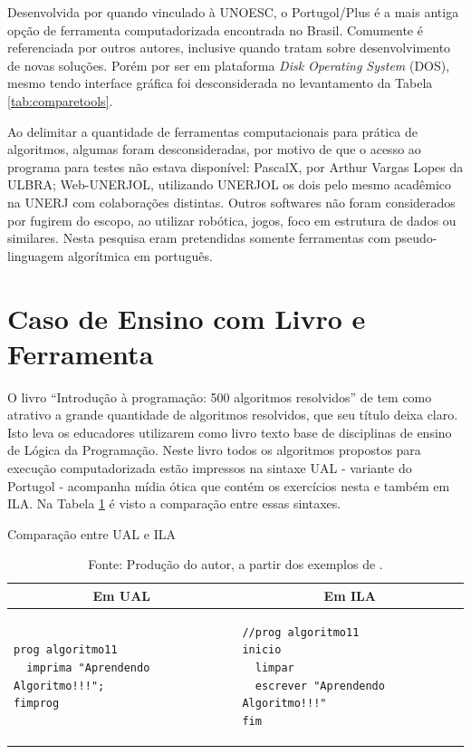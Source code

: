Desenvolvida por  quando vinculado à UNOESC, o Portugol/Plus é a mais antiga opção de ferramenta computadorizada encontrada no Brasil. Comumente é referenciada por outros autores, inclusive quando tratam sobre desenvolvimento de novas soluções. Porém por ser em plataforma \textit{Disk Operating System} (DOS), mesmo tendo interface gráfica foi desconsiderada no levantamento da Tabela \ref{tab:comparetools}.

Ao delimitar a quantidade de ferramentas computacionais para prática de algoritmos, algumas foram desconsideradas, por motivo de que o acesso ao programa para testes não estava disponível: PascalX, por Arthur Vargas Lopes da ULBRA; Web-UNERJOL\nocite{ferrandin2005etal}, utilizando UNERJOL os dois pelo mesmo acadêmico na UNERJ com colaborações distintas.
Outros softwares não foram considerados por fugirem do escopo, ao utilizar robótica, jogos, foco em estrutura de dados ou similares. Nesta pesquisa eram pretendidas somente ferramentas com pseudo-linguagem algorítmica em português.

\section{Caso de Ensino com Livro e Ferramenta}

O livro ``Introdução à programação: 500 algoritmos resolvidos'' de  tem como atrativo a grande quantidade de algoritmos resolvidos, que seu título deixa claro. Isto leva os educadores utilizarem como livro texto base de disciplinas de ensino de Lógica da Programação. Neste livro todos os algoritmos propostos para execução computadorizada estão impressos na sintaxe UAL - variante do Portugol - acompanha mídia ótica que contém os exercícios nesta e também em ILA. Na Tabela \ref{tab:compare-ualila} é visto a comparação entre essas sintaxes.

\begin{table}[h]
\centering
  \caption{Comparação entre UAL e ILA}\label{tab:compare-ualila}
\begin{tabular}{p{75mm} | p{75mm}}\hline
\multicolumn{1}{c|}{\textbf{Em UAL}} & \multicolumn{1}{c}{\textbf{Em ILA}} \\ \hline
\begin{lstlisting}[language=ual,style=table]
prog algoritmo11
  imprima "Aprendendo Algoritmo!!!";
fimprog
\end{lstlisting} &
\begin{lstlisting}[language=ila,style=table]
//prog algoritmo11
inicio
  limpar
  escrever "Aprendendo Algoritmo!!!"
fim
\end{lstlisting} \\ \hline
\end{tabular}
  \caption*{\ifdraft{\color{green}}{}\footnotesize Fonte: Produção do autor, a partir dos exemplos de .}
\end{table}

